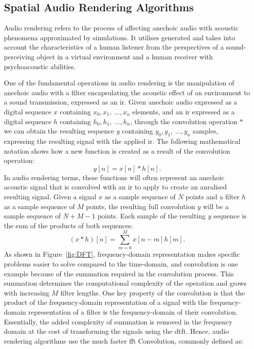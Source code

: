 \subsection{Spatial Audio Rendering Algorithms}
\label{sec:real-time-conv}
Audio rendering refers to the process of affecting anechoic audio with acoustic phenomena approximated by simulations. It utilises generated  and takes into account the characteristics of a human listener from the perspectives of a sound-perceiving object in a virtual environment and a human receiver with psychoacoustic abilities.\par
One of the fundamental operations in audio rendering is the manipulation of anechoic audio with a filter encapsulating the acoustic effect of an environment to a sound transmission, expressed as an \acrshort{ir}. Given anechoic audio expressed as a digital sequence $x$ containing $x_0, x_1,~\dots,x_n$ elements, and an \acrshort{ir} expressed as a digital sequence $h$ containing $h_0, h_1,~\dots,h_n$, through the convolution operation $*$ we can obtain the resulting sequence $y$ containing $y_0, y_1,~\dots, y_n$ samples, expressing the resulting signal with the applied \acrshort{ir}. The following mathematical notation shows how a new function is created as a result of the convolution operation:
\begin{equation}
    y[n] = x[n] * h[n].
\label{eq:1d-convolution}
\end{equation}
In audio rendering terms, these functions will often represent an anechoic acoustic signal that is convolved with an \acrshort{ir} to apply to create an auralised resulting signal. Given a signal $x$ as a sample sequence of $N$ points and a filter $h$ as a sample sequence of $M$ points, the resulting full convolution $y$ will be a sample sequence of $N + M - 1$ points. Each sample of the resulting $y$ sequence is the sum of the products of both sequences: 
\begin{equation}
    (x * h)[n] = \sum_{m=0}^{M}x[n-m]h[m].
\end{equation}
As shown in Figure~\ref{fig:DFT}, frequency-domain representation makes specific problems easier to solve compared to the time-domain, and convolution is one example because of the summation required in the convolution process. This summation determines the computational complexity of the operation and grows with increasing $M$ filter lengths. One key property of the convolution is that the product of the frequency-domain representation of a signal with the frequency-domain representation of a filter is the frequency-domain of their convolution. Essentially, the added complexity of summation is removed in the frequency domain at the cost of transforming the signals using the \acrshort{dtft}. Hence, audio rendering algorithms use the much faster \acrfull{fft} Convolution, commonly defined as:
